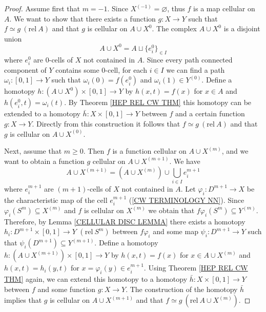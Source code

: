 \documentclass[11pt, letterpaper, oneside]{report}
\theoremstyle{pplain}
\theoremstyle{ddefinition}
\theoremstyle{nnn}
\theoremstyle{eexercise}
\newcommand{\rel}{\mathrm{rel\ }}
\begin{document}
\begin{proof}
Assume first that $m=-1$. Since $X^{(-1)} = \varnothing$, thus $f$ is a map cellular on $A$. 
We want to show that there exists a function $g\colon X\to Y$  such that  $f\simeq g \ (\rel A)$ and 
that $g$ is cellular on $A\cup X^{0}$. The complex  $A\cup X^{0}$ is a disjoint union  
$$A\cup X^{0} = A \sqcup \{e^{0}_{i}\}_{\in I}$$  
where $e^{0}_{i}$  are 0-cells of $X$ not contained in $A$. 
Since every path connected component of $Y$ contains some $0$-cell, for each $i\in I$ we can find a path 
$\omega_{i}\colon [0, 1] \to Y$ such that  $\omega_{i}(0) = f(e^{0}_{i})$ and $\omega_{i}(1) \in Y^{(0)}$. Define a homotopy 
$h\colon (A\cup X^{0})\times [0, 1] \to Y$ by $h(x, t) = f(x)$ for  $x\in A$ and 
$h(e^{0}_{i}, t) = \omega_{i}(t)$. By Theorem \ref{HEP REL CW THM} this homotopy 
can be extended to a homotopy $\bar{h}\colon X \times [0, 1] \to Y$ between $f$
and a certain function $g\colon X\to Y$. Directly from this construction it follows that 
$f\simeq g \ (\rel A)$ and that $g$ is cellular on $A\cup X^{(0)}$. 


Next, assume that $m\geq 0$. Then $f$ is a function cellular on $A\cup X^{(m)}$, and we want to 
obtain a function $g$ cellular on $A\cup X^{(m+1)}$. We have 
$$A\cup X^{(m+1)} = (A\cup X^{(m)}) \cup \bigcup_{i\in I} e^{m+1}_{i}$$
where $ e^{m+1}_{i}$ are $(m+1)$-cells of $X$ not contained in $A$. 
Let $\varphi_{i}\colon D^{m+1} \to X$ be the characteristic map of the cell $e^{m+1}_{i}$
(\ref{CW TERMINOLOGY NN}). Since $\varphi_{i}(S^{m})\subseteq X^{(m)}$ and $f$
is cellular on $X^{(m)}$ we obtain that $f\varphi_{i}(S^{m})\subseteq Y^{(m)}$. 
Therefore, by Lemma \ref{CELLULAR DISC LEMMA} there exists a homotopy 
$h_{i}\colon D^{m+1}\times [0, 1]\to Y$  $(\rel  S^{m})$ between $f\varphi_{i}$
and some map $\psi_{i}\colon D^{m+1} \to Y$ such that $\psi_{i}(D^{m+1}) \subseteq Y^{(m+1)}$.
Define a homotopy  $h\colon (A\cup X^{(m+1)})\times [0, 1] \to Y$ by 
$h(x, t) = f(x)$ for $x\in A\cup X^{(m)}$ and 
$h(x, t) = h_{i}(y, t)$ for $x = \varphi_{i}(y) \in e^{m+1}_{i}$. Using Theorem \ref{HEP REL CW THM}
again, we can extend this homotopy to  a homotopy $\bar{h}\colon X \times [0, 1] \to Y$ between $f$
and some function $g\colon X\to Y$. The construction of the homotopy $\bar{h}$ implies that 
$g$ is cellular on   $A\cup X^{(m+1)}$ and that $f\simeq g \ (\rel  A\cup X^{(m)})$.
\end{proof}
\end{document}
